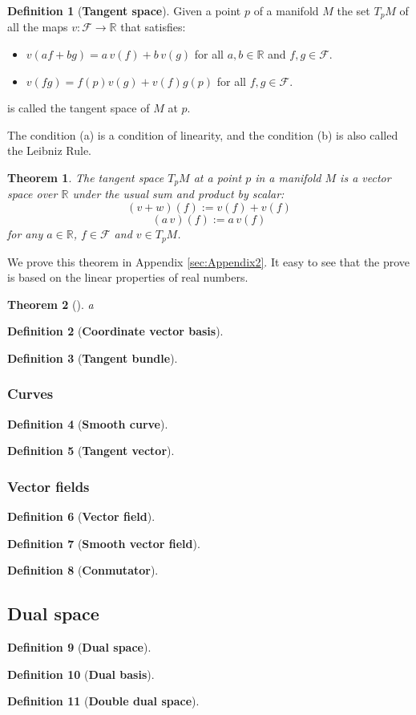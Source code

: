 \documentclass[10pt, letterpaper, oneside]{book}
\theoremstyle{theorem} %
\newtheorem{theorem}{Theorem}%
\theoremstyle{theorem} %
\theoremstyle{definition}
\newtheorem{definition}{Definition}%
\theoremstyle{remark}
\theoremstyle{definition}
\theoremstyle{definition}
\theoremstyle{theorem}
\def\Re{\mathbb{R}}
\def\Fu{\mathscr{F}}
\def\bth{\begin{theorem}}
\def\eth{\end{theorem}}
\def\bde{\begin{definition}}
\def\ede{\end{definition}}
\begin{document}
\bde[\bf Tangent space]
Given a point $p$ of a manifold $M$ the set $T_pM$ of all the maps $v:\Fu\to \Re$ that satisfies:
\begin{itemize}
	\item[(a)] $v(af+bg)=a\,v(f)+b\,v(g)$ for all $a,b\in\Re$ and $f,g\in\Fu$.
	\item[(b)] $v(fg)=f(p)v(g)+v(f)g(p)$ for all $f,g\in\Fu$.
\end{itemize} 
is called the tangent space of $M$ at $p$. 
\ede
The condition (a) is a condition of linearity, and the condition (b) is also called the Leibniz Rule.

\bth
\rm
The tangent space $T_pM$ at a point $p$ in a manifold $M$ is a vector space over $\Re$ under the usual sum and product by scalar:
$$(v+w)(f):=v(f)+v(f)$$
$$(a\,v)(f):=a\,v(f)$$
for any $a\in\Re$, $f\in\Fu$ and $v\in T_pM$.
\eth

We prove this  theorem in Appendix \ref{sec:Appendix2}. It easy to see that the prove is based on the linear properties of real numbers.

\bth[\bf]
a
\eth

\bde[\bf Coordinate vector basis]

\ede

\bde[\bf Tangent bundle]

\ede

\subsubsection*{Curves}
\bde[\bf Smooth curve]

\ede

\bde[\bf Tangent vector]

\ede

\subsubsection*{Vector fields}
\bde[\bf Vector field]
\ede

\bde[\bf Smooth vector field]
\ede

\bde[\bf Conmutator]
\ede

\subsection*{Dual space}
\bde[\bf Dual space]
\ede

\bde[\bf Dual basis]
\ede

\bde[\bf Double dual space]
\ede
\end{document}
